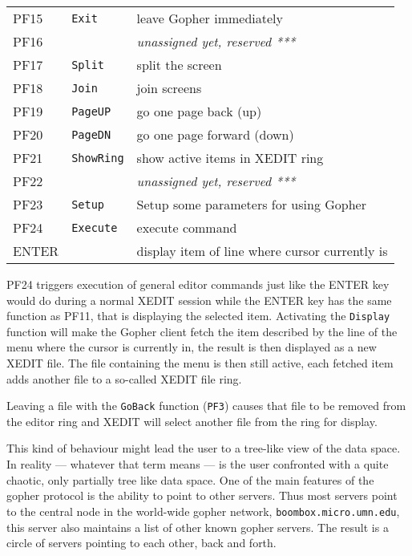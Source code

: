 \begin{table}
\begin{center}
\begin{tabular}{|l|l|l|}
PF15    & {\tt Exit}        & leave Gopher immediately                      \\
PF16    &                   & {\it unassigned yet, reserved ***}            \\
\hline
PF17    & {\tt Split}       & split the screen                              \\
PF18    & {\tt Join}        & join screens                                  \\
PF19    & {\tt PageUP}      & go one page back (up)                         \\
PF20    & {\tt PageDN}      & go one page forward (down)                    \\
\hline
PF21    & {\tt ShowRing}    & show active items in XEDIT ring               \\
PF22    &                   & {\it unassigned yet, reserved ***}            \\
PF23    & {\tt Setup}       & Setup some parameters for using Gopher        \\
PF24    & {\tt Execute}     & execute command                               \\
\hline\hline
ENTER   &                   & display item of line where cursor currently is\\
\hline
\end{tabular}
\end{center}
\end{table}




PF24 triggers execution of general editor commands just like the ENTER
key would do during a normal XEDIT session while the ENTER key has the
same function as PF11, that is displaying the selected item.
Activating the {\tt Display} function will make the
Gopher client fetch the item described by the line of the menu where
the cursor is currently in, the result is then displayed as a new XEDIT
file. The file containing the menu is then still active, each fetched
item adds another file to a so-called XEDIT file ring.

Leaving a file with the {\tt GoBack} function ({\tt PF3}) causes that file
to be removed from the editor ring and XEDIT will select another file from
the ring for display.

This kind of behaviour might lead the user to a tree-like view of the
data space.  In reality --- whatever that term means --- is the user
confronted with a quite chaotic, only partially tree like data space.
One of the main features of the gopher protocol is the ability to point
to other servers.  Thus most servers point to the central node in the
world-wide gopher network, {\tt boombox.micro.umn.edu}, this server also
maintains a list of other known gopher servers.  The result is a circle
of servers pointing to each other, back and forth.




